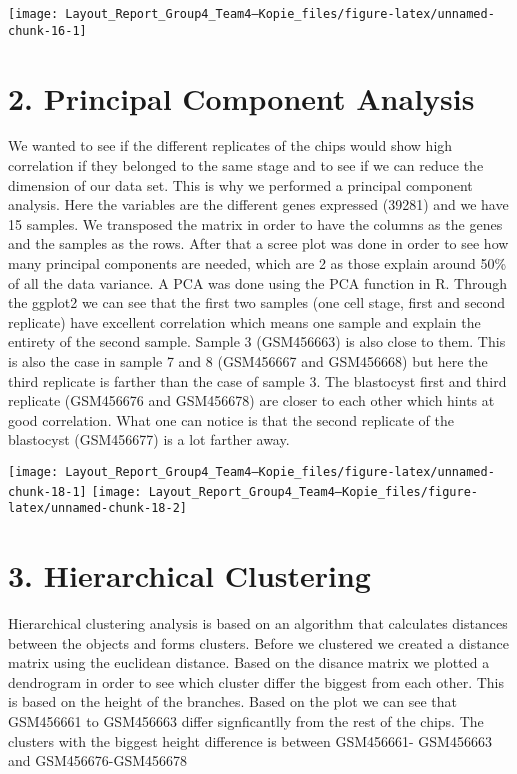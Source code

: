 \documentclass[
  parskip,
  oneside]{scrreprt}
\begin{document}
\texttt{[image: Layout\_Report\_Group4\_Team4---Kopie\_files/figure-latex/unnamed-chunk-16-1]}

\hypertarget{principal-component-analysis}{%
\section{2. Principal Component
Analysis}\label{principal-component-analysis}}

We wanted to see if the different replicates of the chips would show
high correlation if they belonged to the same stage and to see if we can
reduce the dimension of our data set. This is why we performed a
principal component analysis. Here the variables are the different genes
expressed (39281) and we have 15 samples. We transposed the matrix in
order to have the columns as the genes and the samples as the rows.
After that a scree plot was done in order to see how many principal
components are needed, which are 2 as those explain around 50\% of all
the data variance. A PCA was done using the PCA function in R. Through
the ggplot2 we can see that the first two samples (one cell stage, first
and second replicate) have excellent correlation which means one sample
and explain the entirety of the second sample. Sample 3 (GSM456663) is
also close to them. This is also the case in sample 7 and 8 (GSM456667
and GSM456668) but here the third replicate is farther than the case of
sample 3. The blastocyst first and third replicate (GSM456676 and
GSM456678) are closer to each other which hints at good correlation.
What one can notice is that the second replicate of the blastocyst
(GSM456677) is a lot farther away.

\texttt{[image: Layout\_Report\_Group4\_Team4---Kopie\_files/figure-latex/unnamed-chunk-18-1]}
\texttt{[image: Layout\_Report\_Group4\_Team4---Kopie\_files/figure-latex/unnamed-chunk-18-2]}

\hypertarget{hierarchical-clustering-1}{%
\section{3. Hierarchical Clustering}\label{hierarchical-clustering-1}}

Hierarchical clustering analysis is based on an algorithm that
calculates distances between the objects and forms clusters. Before we
clustered we created a distance matrix using the euclidean distance.
Based on the disance matrix we plotted a dendrogram in order to see
which cluster differ the biggest from each other. This is based on the
height of the branches. Based on the plot we can see that GSM456661 to
GSM456663 differ signficantlly from the rest of the chips. The clusters
with the biggest height difference is between GSM456661- GSM456663 and
GSM456676-GSM456678
\end{document}

